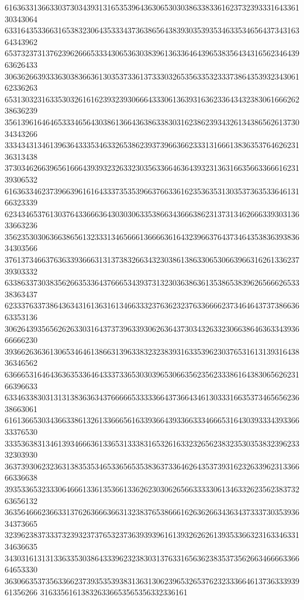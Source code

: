 61636331366330373034393131653539643630653030386338336162373239333164336130343064
63316435336631653832306435333437363865643839303539353463353465643734316364343962
65373237313762396266653334306536303839613633646439653835643431656234643963626433
30636266393336303836636130353733613733303265356335323337386435393234306162336263
65313032316335303261616239323930666433306136393163623364343238306166626238636239
35613961646465333465643038613664363863383031623862393432613438656261373034343266
33343431346139636433353463326538623937396636623331316661383635376462623136313438
37303462663965616664393932326332303563366463643932313631663566336661623139306532
61636334623739663961616433373535396637663361623536353130353736353364613166323339
62343465376130376433666364303030633538663436663862313731346266633930313633663236
35623530306366386561323331346566613666636164323966376437346435383639383634303566
37613734663763633936663131373832663432303861386330653066396631626133623739303332
63386337303835626635336437666534393731323036386361353865383962656662653338363437
62333763373864363431613631613466333237636232376336666237346464373738663663353136
30626439356562626330316437373963393062636437303432633230663864636334393666666230
39366263636130653464613866313963383232383931633539623037653161313931643836346562
63666531646436363533646433373365303039653066356235623338616438306562623166396633
63346338303131313836363437666665333336643736643461303331663537346565623638663061
61613665303436633861326133666561633936643933663334666531643039333439336633376530
33353638313461393466636133653133383165326163323265623832353035383239623332303930
36373930623236313835353465336565353836373364626435373931623263396231336666336638
39353365323330646661336135366133626230306265663333306134633262356238373263656132
36356466623663313762636663663132383765386661626362663436343733373035393634373665
32396238373337323932373765323736393939616139326262613935336632316334633134636635
34303161313133633530386433396232383031376331656362383537356266346666336664653330
36306635373563366237393535393831363130623965326537623233366461373633393961356266
316335616138326336653565356332336161

